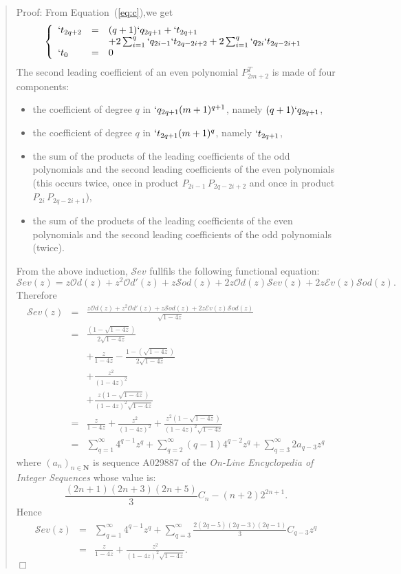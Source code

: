 \documentclass[preprint,authoryear]{elsarticle}
\newenvironment{proof}[1]{\begin{quotation}\noindent\textsf{Proof:} #1}{\(\Box\)\end{quotation}}
\newcommand{\Od}{\mathcal{O}d}
\newcommand{\Sod}{\mathcal{S}od}
\newcommand{\Ev}{\mathcal{E}v}
\newcommand{\Sev}{\mathcal{S}ev}
\begin{document}
\begin{proof}{}
From Equation~(\ref{eq:c}),we get
\begin{displaymath}
  \left\{
    \begin{array}{lcl}
      `t_{2q+2} &=& (q+1) `q_{2q+1} + `t_{2q+1} \\&&+ 2 \sum_{i=1}^q`q_{2i-1}`t_{2q-2i+2} 
      + 2 \sum_{i=1}^q`q_{2i}`t_{2q-2i+1}\\
      `t_0 &=&0
    \end{array}
\right.
\end{displaymath}
The second leading coefficient of an even polynomial $P_{2m+2}^T$ is made of four components:
\begin{itemize}
\item the coefficient of degree $q$ in $`q_{2q+1}(m+1)^{q+1}$, namely ${(q+1) `q_{2q+1}}$,
\item the coefficient of degree $q$ in $`t_{2q+1}(m+1)^q$, namely $`t_{2q+1}$,
\item the sum of the products of the leading coefficients of the odd polynomials and the
  second leading coefficients of the even polynomials (this occurs twice, once in product
  $P_{2i-1}\,P_{2q-2i+2}$ and once in product $P_{2i}\,P_{2q-2i+1}$),
\item the sum of the products of the leading coefficients of the even polynomials and the
  second leading coefficients of the odd polynomials (twice).
\end{itemize}

From the above induction, $\Sev$ fullfils the following functional equation:
\begin{displaymath}
  \Sev(z) = z \Od(z) + z^2\Od'(z) + z \Sod(z) + 2z \Od(z)\Sev(z) + 2z\Ev(z)\Sod(z).
\end{displaymath}
Therefore
\begin{eqnarray*}
  \Sev(z) &=& \frac{z \Od(z) + z^2\Od'(z) + z \Sod(z) + 2z\Ev(z)\Sod(z)}{\sqrt{1-4z}}\\
&=& \frac{(1-\sqrt{1-4z})}{2\sqrt{1-4z}} \\
&&+ \frac{z}{1-4 z}-\frac{1-\left(\sqrt{1-4 z}\right)}{2 \sqrt{1-4z}}\\
&&+ \frac{z^2}{(1-4z)^2}\\
&& + \frac{z(1-\sqrt{1-4z})}{(1-4z)^2\sqrt{1-4z}}\\
&=& \frac{z}{1-4 z} + \frac{z^2}{(1-4z)^2} +
\frac{z^2(1-\sqrt{1-4z})}{(1-4z)^2\sqrt{1-4z}}\\
&=& \sum_{q=1}^{\infty}4^{q-1} z^q + \sum_{q=2} ^{\infty}(q-1) 4^{q-2} z^q + \sum_{q=3}^{\infty} 2a_{q-3}z^q
\end{eqnarray*}
where $(a_n)_{n\in\mathbf{N}}$ is sequence \textsf{A029887} of  the \emph{On-Line Encyclopedia of
  Integer Sequences} whose value is:
\[\frac{(2n+1)(2n+3)(2n+5)}{3}C_n-(n+2)2^{2n+1}.\]
  Hence 
\begin{eqnarray*}
  \Sev(z) &=& \sum_{q=1}^{\infty}4^{q-1} z^q + \sum_{q=3}^{\infty}  \frac{2 (2q - 5)(2q-3)(2q -1)}{3}  C_{q-3}z^q\\
  &=& \frac{z}{1-4z} + \frac{z^2}{(1-4z)^2\sqrt{1-4z}}.
\end{eqnarray*}
\end{proof}
\end{document}
